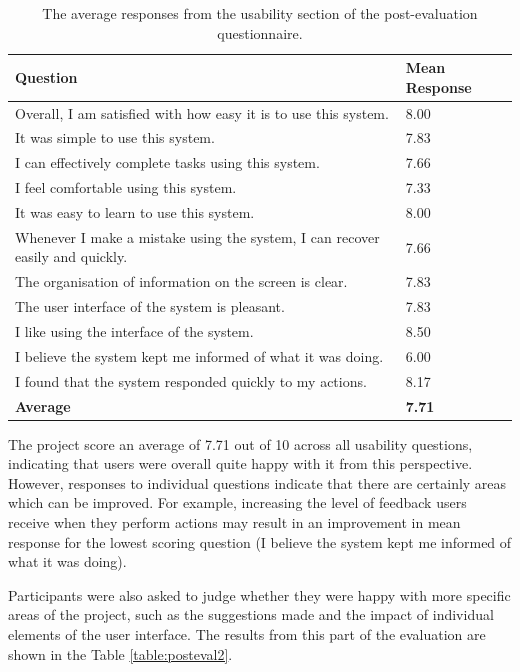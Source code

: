 \documentclass{l4proj}
\begin{document}
\begin{table}[H]
    \centering
    \begin{tabular}{| l | l |}
    \hline
    Question & Mean Response \\ \hline
    Overall, I am satisfied with how easy it is to use this system. & 8.00 \\ \hline
    It was simple to use this system. & 7.83 \\ \hline
    I can effectively complete tasks using this system. &  7.66 \\ \hline
    I feel comfortable using this system. & 7.33 \\ \hline
    It was easy to learn to use this system. & 8.00 \\ \hline
    Whenever I make a mistake using the system, I can recover easily and quickly. & 7.66 \\ \hline
    The organisation of information on the screen is clear. & 7.83  \\ \hline
    The user interface of the system is pleasant. & 7.83  \\ \hline
    I like using the interface of the system. & 8.50  \\ \hline
    I believe the system kept me informed of what it was doing. & 6.00 \\ \hline
    I found that the system responded quickly to my actions. & 8.17  \\ \hline
    \textbf{Average} & \textbf{7.71} \\
    \hline
    \end{tabular}
    \caption{\label{table:posteval}The average responses from the usability section of the post-evaluation questionnaire.}
\end{table}

The project score an average of 7.71 out of 10 across all usability questions, indicating that users were overall quite happy with it from this perspective. However, responses to individual questions indicate that there are certainly areas which can be improved. For example, increasing the level of feedback users receive when they perform actions may result in an improvement in mean response for the lowest scoring question (I believe the system kept me informed of what it was doing).

Participants were also asked to judge whether they were happy with more specific areas of the project, such as the suggestions made and the impact of individual elements of the user interface. The results from this part of the evaluation are shown in the Table \ref{table:posteval2}.
\end{document}

